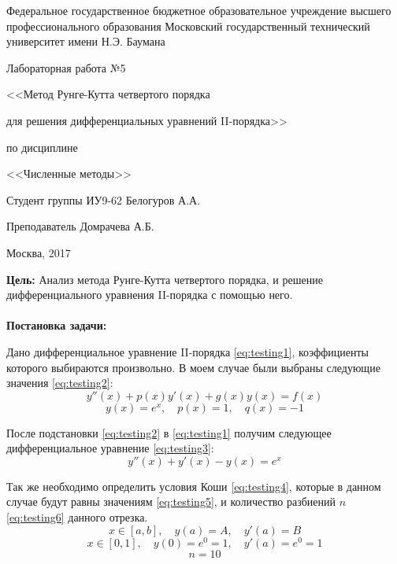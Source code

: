 \documentclass[a4paper, 12pt]{article}   	%
\begin{document}
\begin{titlepage}

\thispagestyle{empty}

\begin{center}
Федеральное государственное бюджетное образовательное учреждение высшего профессионального образования Московский государственный технический университет имени Н.Э. Баумана
\end{center}


\vfill

\centerline{\large{Лабораторная работа №5}}
\centerline{\large{<<Метод Рунге-Кутта четвертого порядка}}
\centerline{\large{для решения дифференциальных уравнений II-порядка>>}}
\centerline{\large{по дисциплине}}
\centerline{\large{<<Численные методы>>}}

\vfill

Студент группы ИУ9-62 \hfill Белогуров А.А.

Преподаватель \hfill Домрачева А.Б.
\vfill

\centerline{Москва, 2017}
\clearpage
\end{titlepage}

\newpage
\setcounter{page}{2}

\textbf{Цель:}
Анализ метода Рунге-Кутта четвертого порядка, и решение дифференциального уравнения II-порядка с помощью него.
\\\\

 
 \textbf{Постановка задачи:}
 
 Дано дифференциальное уравнение II-порядка \eqref{eq:testing1}, коэффициенты которого выбираются произвольно. В моем случае были выбраны следующие значения \eqref{eq:testing2}:
  \begin{equation}\label{eq:testing1}
 y''(x) + p(x)y'(x) + g(x)y(x) = f(x)
 \end{equation}
  \begin{equation}\label{eq:testing2}
y(x) = e^x,\quad p(x) = 1,\quad q(x) = -1
 \end{equation}
 
 После подстановки \eqref{eq:testing2} в \eqref{eq:testing1} получим следующее дифференциальное уравнение \eqref{eq:testing3}:
 \begin{equation}\label{eq:testing3}
y''(x) + y'(x) - y(x) = e^x
 \end{equation}
 
 Так же необходимо определить условия Коши \eqref{eq:testing4}, которые в данном случае будут равны значениям \eqref{eq:testing5}, и количество разбиений $n$ \eqref{eq:testing6} данного отрезка. 
  \begin{equation}\label{eq:testing4}
x \in [a, b], \quad y(a) = A, \quad y'(a) = B
 \end{equation}
  \begin{equation}\label{eq:testing5}
x \in [0, 1], \quad y(0) = e^0 = 1, \quad y'(a) = e^0 = 1
 \end{equation}
 \begin{equation}\label{eq:testing6}
n = 10
 \end{equation}
\end{document}
